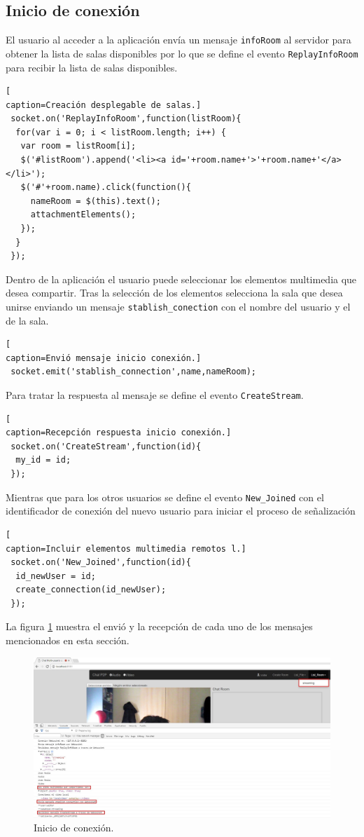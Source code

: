 \subsection*{Inicio de conexión}
El usuario al acceder a la aplicación envía un mensaje \texttt{infoRoom} al servidor para obtener la lista de salas disponibles por lo que se define el evento \texttt{ReplayInfoRoom} para recibir la lista de salas disponibles.
\begin{lstlisting}[
caption=Creación desplegable de salas.]
 socket.on('ReplayInfoRoom',function(listRoom){
  for(var i = 0; i < listRoom.length; i++) {
   var room = listRoom[i];
   $('#listRoom').append('<li><a id='+room.name+'>'+room.name+'</a></li>');
   $('#'+room.name).click(function(){
     nameRoom = $(this).text();
     attachmentElements();
   });
  }
 });
\end{lstlisting}

Dentro de la aplicación el usuario puede seleccionar los elementos multimedia que desea compartir. Tras la selección de los elementos selecciona la sala que desea unirse enviando un mensaje \texttt{stablish\_conection} con el nombre del usuario y el de la sala.
\begin{lstlisting}[
caption=Envió mensaje inicio conexión.]
 socket.emit('stablish_connection',name,nameRoom);
\end{lstlisting}
Para tratar la respuesta al mensaje se define el evento \texttt{CreateStream}.
\begin{lstlisting}[
caption=Recepción respuesta inicio conexión.]
 socket.on('CreateStream',function(id){
  my_id = id;
 });
\end{lstlisting}

Mientras que para los otros usuarios se define el evento \texttt{New\_Joined} con el identificador de conexión del nuevo usuario para iniciar el proceso de señalización 
\begin{lstlisting}[
caption=Incluir elementos multimedia remotos l.]
 socket.on('New_Joined',function(id){
  id_newUser = id;
  create_connection(id_newUser);
 });
\end{lstlisting}

La figura \ref{fig:StablishConnectionClient} muestra el envió y la recepción de cada uno de los mensajes mencionados en esta sección.
\begin{figure}[!h]
\centering
\includegraphics[width=1\linewidth]{Figures/StablishConnectionClient}
\decoRule
\caption[Inicio de conexión.]{Inicio de conexión.}
\label{fig:StablishConnectionClient}
\end{figure}
